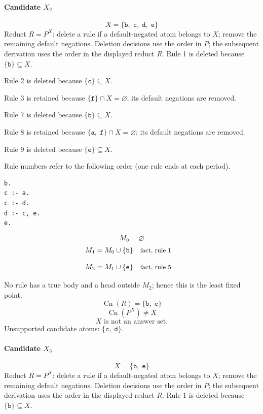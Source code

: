 \documentclass[a4paper,11pt]{article}
\newif\ifexplain
\newcommand{\explain}[1]{\ifexplain\begin{erklbox}#1\end{erklbox}\fi}
\newcommand{\why}[1]{\text{\small #1}}
\newcommand{\at}[1]{\texttt{#1}}
\begin{document}
\paragraph{Candidate $X_2$}
\[
X=\{\at{b},\;\at{c},\;\at{d},\;\at{e}\}
\]
Reduct $R=P^X$: delete a rule if a default-negated atom belongs to $X$; remove the remaining default negations. Deletion decisions use the order in $P$; the subsequent derivation uses the order in the displayed reduct $R$.
Rule 1 is deleted because $\{\at{b}\}\subseteq X$.

Rule 2 is deleted because $\{\at{c}\}\subseteq X$.

Rule 3 is retained because $\{\at{f}\}\cap X=\varnothing$; its default negations are removed.

Rule 7 is deleted because $\{\at{b}\}\subseteq X$.

Rule 8 is retained because $\{\at{a},\;\at{f}\}\cap X=\varnothing$; its default negations are removed.

Rule 9 is deleted because $\{\at{e}\}\subseteq X$.

Rule numbers refer to the following order (one rule ends at each period).
\begin{small}
\begin{verbatim}
b.
c :- a.
c :- d.
d :- c, e.
e.
\end{verbatim}
\end{small}
\explain{Beim Redukt bleibt die Kandidatenmenge fest. Wir entscheiden zuerst, welche Regeln wegfallen. Erst danach berechnen wir aus den verbleibenden positiven Regeln die kleinste abgeschlossene Menge. Ein Modell allein reicht nicht: Diese Menge muss genau der Kandidat sein.}
\[
M_0=\varnothing
\]
\begin{align*}
M_{1} &= M_{0}\cup \{\at{b}\} && \why{fact, rule 1}
\end{align*}
\explain{Diese Regel hat keinen Körper. Ihr Kopf $\at{b}$ ist damit ein Fakt und muss in die Menge.}
\begin{align*}
M_{2} &= M_{1}\cup \{\at{e}\} && \why{fact, rule 5}
\end{align*}
\explain{Diese Regel hat keinen Körper. Ihr Kopf $\at{e}$ ist damit ein Fakt und muss in die Menge.}
No rule has a true body and a head outside $M_{2}$; hence this is the least fixed point.
\[
\operatorname{Cn}(R)=\{\at{b},\;\at{e}\}
\]
\[
\operatorname{Cn}(P^X)\ne X
\]
\[
\boxed{X\text{ is not an answer set.}}
\]
Unsupported candidate atoms: $\{\at{c},\;\at{d}\}$.
\paragraph{Candidate $X_3$}
\[
X=\{\at{b},\;\at{e}\}
\]
Reduct $R=P^X$: delete a rule if a default-negated atom belongs to $X$; remove the remaining default negations. Deletion decisions use the order in $P$; the subsequent derivation uses the order in the displayed reduct $R$.
Rule 1 is deleted because $\{\at{b}\}\subseteq X$.
\end{document}
